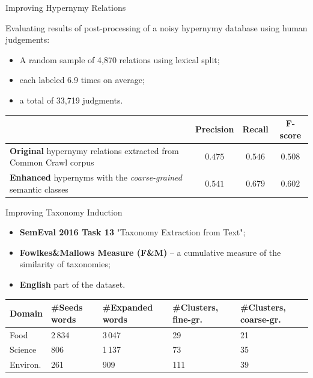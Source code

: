 \documentclass[usenames,dvipsnames]{beamer}
\begin{document}
\begin{frame}{ Improving Hypernymy Relations }

Evaluating results of post-processing of a noisy hypernymy database using human judgements:


\begin{itemize}
	\item A random sample of 4,870 relations using lexical split; 
	\item each labeled 6.9 times on average;
	\item a total of 33,719 judgments.
\end{itemize}

\pause 

\begin{table}
\footnotesize
\centering

\begin{tabular}{p{6cm}|c|c|c}
 & \textbf{Precision} & \textbf{Recall} & \textbf{F-score} \\ \toprule
\textbf{\alert{Original}} hypernymy relations extracted from Common Crawl corpus~\cite{seitner2016large} & $0.475$ & $0.546$ & $0.508$ \\ \midrule 
\textbf{\alert{Enhanced}} hypernyms with the \textit{coarse-grained} semantic classes   & $\mathbf{0.541}$ & $\mathbf{0.679}$ & $\mathbf{0.602}$ \\ 
\end{tabular}

\end{table}

\end{frame}


\begin{frame}{ Improving Taxonomy Induction }

\begin{itemize}
	\item \textbf{SemEval 2016 Task 13} "Taxonomy Extraction from Text";
	\item \textbf{Fowlkes\&Mallows Measure (F\&M)} -- a cumulative measure of the similarity of taxonomies;
	\item \textbf{English} part of the dataset.
\end{itemize}

\pause 



\begin{table}
\footnotesize
\centering
\begin{tabular}{l|p{0.9cm}|p{1.4cm}|p{1.3cm}|p{1.5cm}}
\textbf{Domain} & \textbf{\#Seeds words} & \textbf{\#Expanded words} & \textbf{\#Clusters}, fine-gr. & \textbf{\#Clusters}, coarse-gr.  \\ \toprule
Food & 2\,834 & 3\,047 & 29 & 21 \\
Science & 806 & 1\,137 & 73 & 35 \\
Environ. & 261 & 909 & 111 & 39 \\
\end{tabular}
\end{table}


\end{frame}
\end{document}
